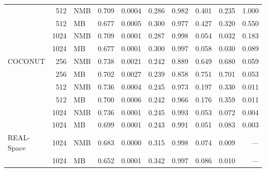 \begin{table}[htbp]
\begin{tabular}{@{}l r l r r r r r r r@{}}
     & 512 & NMB & 0.709 & 0.0004 & 0.286 & 0.982 & 0.401 & 0.235 & 1.000 \\
     & 512 & MB & 0.677 & 0.0005 & 0.300 & 0.977 & 0.427 & 0.320 & 0.550 \\
     & 1024 & NMB & 0.709 & 0.0001 & 0.287 & 0.998 & 0.054 & 0.032 & 0.183 \\
     & 1024 & MB & 0.677 & 0.0001 & 0.300 & 0.997 & 0.058 & 0.030 & 0.089 \\
    \addlinespace
    COCONUT & 256 & NMB & 0.738 & 0.0021 & 0.242 & 0.889 & 0.649 & 0.680 & 0.059 \\
     & 256 & MB & 0.702 & 0.0027 & 0.239 & 0.858 & 0.751 & 0.701 & 0.053 \\
     & 512 & NMB & 0.736 & 0.0004 & 0.245 & 0.973 & 0.197 & 0.330 & 0.011 \\
     & 512 & MB & 0.700 & 0.0006 & 0.242 & 0.966 & 0.176 & 0.359 & 0.011 \\
     & 1024 & NMB & 0.736 & 0.0001 & 0.245 & 0.993 & 0.053 & 0.072 & 0.004 \\
     & 1024 & MB & 0.699 & 0.0001 & 0.243 & 0.991 & 0.051 & 0.083 & 0.003 \\
    \addlinespace
    REAL-Space & 1024 & NMB & 0.683 & 0.0000 & 0.315 & 0.998 & 0.074 & 0.009 & --- \\
     & 1024 & MB & 0.652 & 0.0001 & 0.342 & 0.997 & 0.086 & 0.010 & --- \\
    \bottomrule
  \end{tabular}
\end{table}
